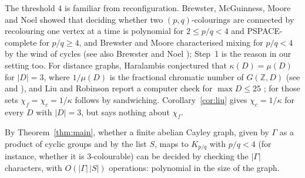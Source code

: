 \documentclass[11pt,a4paper]{amsart}
\theoremstyle{definition}
\newcommand{\Z}{\mathbb{Z}}
\begin{document}
The threshold $4$ is familiar from reconfiguration. Brewster, McGuinness, Moore and Noel \cite{BMMN} showed that
deciding whether two $(p,q)$-colourings are connected by recolouring one vertex at a time is polynomial for
$2\le p/q<4$ and PSPACE-complete for $p/q\ge4$, and Brewster and Moore \cite{BM} characterised mixing for $p/q<4$
by the wind of cycles (see also Brewster and Noel \cite{BN}); Step~1 is the reason in our setting too. For distance
graphs, Haralambis \cite{Haralambis} conjectured that $\kappa(D)=\mu(D)$ for $|D|=3$, where $1/\mu(D)$ is the
fractional chromatic number of $G(\Z,D)$ (see \cite[Problem~2]{Liu} and \cite[Conjecture~3]{LR}), and Liu and
Robinson report a computer check for $\max D\le25$ \cite{LR}; for those sets $\chi_f=\chi_c=1/\kappa$ follows by
sandwiching. Corollary~\ref{cor:liu} gives $\chi_c=1/\kappa$ for every $D$ with $|D|=3$, but says nothing about
$\chi_f$.

By Theorem~\ref{thm:main}, whether a finite abelian Cayley graph, given by $\Gamma$ as a product of cyclic groups and by the list $S$,
maps to $K_{p/q}$ with
$p/q<4$ (for instance, whether it is $3$-colourable) can be decided by checking the $|\Gamma|$ characters, with
$O(|\Gamma|\,|S|)$ operations: polynomial in the size of the graph.
\end{document}
